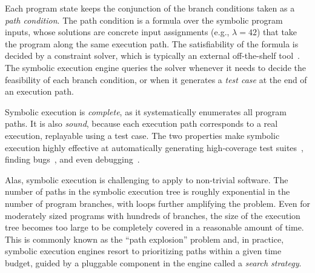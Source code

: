 Each program state keeps the conjunction of the branch conditions taken as a \emph{path condition}.
%
The path condition is a formula over the symbolic program inputs, whose solutions are concrete input assignments (e.g., $\lambda = 42$) that take the program along the same execution path.
%
The satisfiability of the formula is decided by a constraint solver, which is typically an external off-the-shelf tool~\cite{stp,Z3,cvc}.
%
The symbolic execution engine queries the solver whenever it needs to decide the feasibility of each branch condition, or when it generates a \emph{test case} at the end of an execution path.

Symbolic execution is \emph{complete}, as it systematically enumerates all program paths.
%
It is also \emph{sound}, because each execution path corresponds to a real execution, replayable using a test case.
%
The two properties make symbolic execution highly effective at automatically generating high-coverage test suites~\cite{klee}, finding bugs~\cite{sage2012,mayhem}, and even debugging~\cite{esd,oasis,portend,king:symbolic:2}.



Alas, symbolic execution is challenging to apply to non-trivial software.  The number of paths in the symbolic execution tree is roughly exponential in the number of program branches, with loops further amplifying the problem.  Even for moderately sized programs with hundreds of branches, the size of the execution tree becomes too large to be completely covered in a reasonable amount of time.
%
This is commonly known as the ``path explosion'' problem and, in practice, symbolic execution engines resort to prioritizing paths within a given time budget, guided by a pluggable component in the engine called a \emph{search strategy}.


